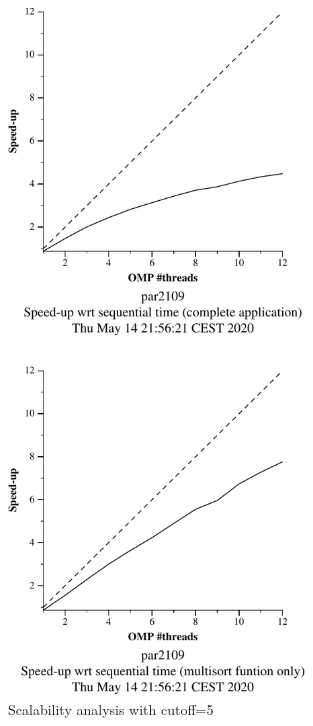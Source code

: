 \begin{figure}[H]
    \begin{minipage}{0.5\textwidth}
        \centering
        \includegraphics[width=0.7\textwidth]{plots/new-omp-tree-cutoff-5-crop.pdf}
        \caption{Scalability analysis with cutoff=5}
        \label{fig:cutoff5} 
    \end{minipage}
    \begin{minipage}{0.5\textwidth}
        \centering

\end{minipage}
\end{figure}
